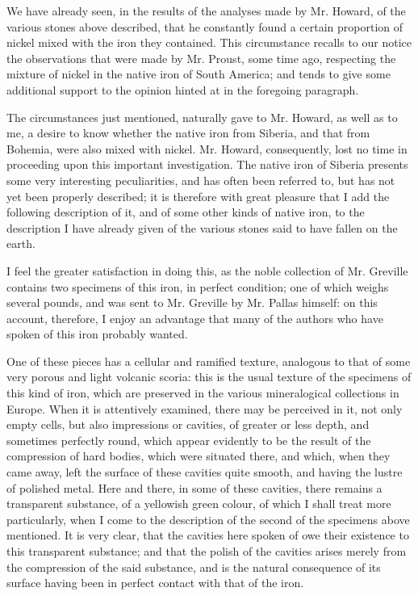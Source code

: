 \documentclass[a4paper, 12pt, oneside, twocolumn]{article}
\begin{document}
We have already seen, in the results of the analyses made by Mr. Howard, of the various stones above described, that he constantly found a certain proportion of nickel mixed with the iron they contained. This circumstance recalls to our notice the observations that were made by Mr. Proust, some time ago, respecting the mixture of nickel in the native iron of South America; and tends to give some additional support to the opinion hinted at in the foregoing paragraph.

The circumstances just mentioned, naturally gave to Mr. Howard, as well as to me, a desire to know whether the native iron from Siberia, and that from Bohemia, were also mixed with nickel. Mr. Howard, consequently, lost no time in proceeding upon this important investigation. The native iron of Siberia presents some very interesting peculiarities, and has often been referred to, but has not yet been properly described; it is therefore with great pleasure that I add the following description of it, and of some other kinds of native iron, to the description I have already given of the various stones said to have fallen on the earth.

I feel the greater satisfaction in doing this, as the noble collection of Mr. Greville contains two specimens of this iron, in perfect condition; one of which weighs several pounds, and was sent to Mr. Greville by Mr. Pallas himself: on this account, therefore, I enjoy an advantage that many of the authors who have spoken of this iron probably wanted.

One of these pieces has a cellular and ramified texture, analogous to that of some very porous and light volcanic scoria: this is the usual texture of the specimens of this kind of iron, which are preserved in the various mineralogical collections in Europe. When it is attentively examined, there may be perceived in it, not only empty cells, but also impressions or cavities, of greater or less depth, and sometimes perfectly round, which appear evidently to be the result of the compression of hard bodies, which were situated there, and which, when they came away, left the surface of these cavities quite smooth, and having the lustre of polished metal. Here and there, in some of these cavities, there remains a transparent substance, of a yellowish green colour, of which I shall treat more particularly, when I come to the description of the second of the specimens above mentioned. It is very clear, that the cavities here spoken of owe their existence to this transparent substance; and that the polish of the cavities arises merely from the compression of the said substance, and is the natural consequence of its surface having been in perfect contact with that of the iron.
\end{document}
